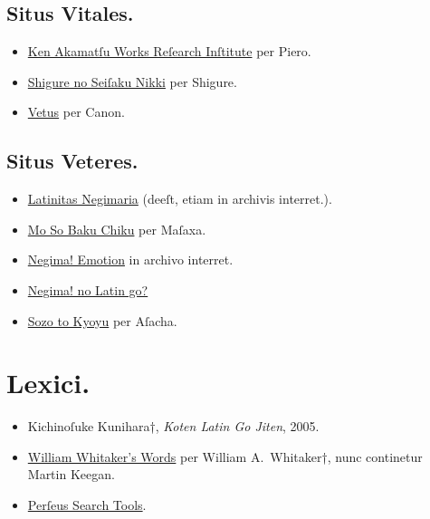 \documentclass[12pt]{book}
\newcommand{\bookname}[1]{\textenglish{\emph{#1}}}
\begin{document}
\subsection*{Situs Vitales.}\label{active-websites}

\begin{itemize}
  \item \href{http://www2u.biglobe.ne.jp/~clown/}{Ken Akamatſu Works Reſearch Inſtitute} per Piero. %
  \item \href{http://tuwabuki20.blog5.fc2.com/}{Shigure no Seiſaku Nikki} per Shigure. %
  \item \href{https://vetus.wordpress.com/}{Vetus} per Canon.
\end{itemize}

\subsection*{Situs Veteres.}\label{oldies}

\begin{itemize}
  \item \href{http://www.genvid.com/diesgaudii/latin/ln/index.html}{Latinitas Negimaria} (deeſt, etiam in archivis interret.).
  \item \href{https://blog.goo.ne.jp/masaxa}{Mo So Baku Chiku} per Maſaxa. %
  \item \href{https://web.archive.org/web/20150419192906/http://www7b.biglobe.ne.jp/~meril/index.html}{Negima! Emotion} in archivo interret. %
  \item \href{https://blog.goo.ne.jp/lowtech224}{Negima! no Latin go?} %
  \item \href{https://asacha.hatenadiary.org/}{Sozo to Kyoyu} per Aſacha. %
\end{itemize}

\section*{Lexici.}\label{lexicons}

\begin{itemize}
  \item Kichinoſuke Kunihara†, \bookname{Koten Latin Go Jiten}, 2005. %
  \item \href{https://github.com/mk270/whitakers-words}{William Whitaker's Words} per William A.~Whitaker†, nunc continetur Martin Keegan.
  \item \href{http://www.perseus.tufts.edu/hopper/search}{Perſeus Search Tools}.
\end{itemize}
\end{document}
